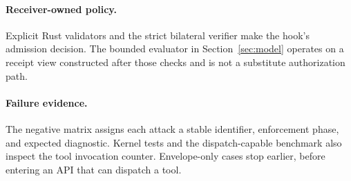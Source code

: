 \paragraph{Receiver-owned policy.}
Explicit Rust validators and the strict bilateral verifier make the hook's
admission decision. The bounded evaluator in Section~\ref{sec:model} operates
on a receipt view constructed after those checks and is not a substitute
authorization path.

\paragraph{Failure evidence.}
The negative matrix assigns each attack a stable identifier, enforcement
phase, and expected diagnostic. Kernel tests and the dispatch-capable
benchmark also inspect the tool invocation counter. Envelope-only cases stop
earlier, before entering an API that can dispatch a tool.
